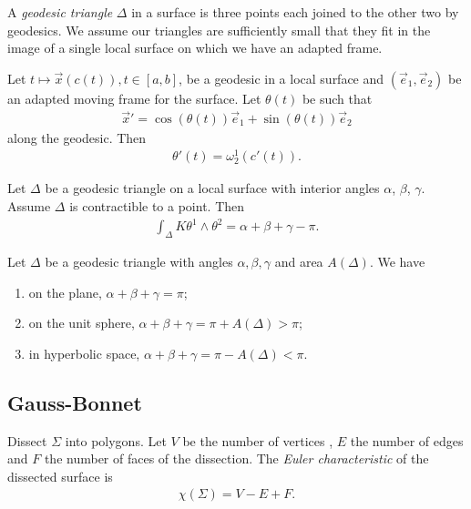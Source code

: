 \documentclass{article}
\begin{document}
\begin{definition}
    A \emph{geodesic triangle} $\Delta$ in a surface is three points each joined to the other 
    two by geodesics. We assume our triangles are sufficiently small that they fit in the image 
    of a single local surface on which we have an adapted frame.
\end{definition}

\begin{proposition}
    Let $t\mapsto \vec x(c(t)), t\in[a,b]$, be a geodesic in a local surface and $(\vec e_1, \vec e_2)$
    be an adapted moving frame for the surface. Let $\theta(t)$ be such that 
    \begin{align*}
        \vec x' = \cos(\theta(t)) \vec e_1 + \sin(\theta(t)) \vec e_2
    \end{align*}
    along the geodesic. Then 
    \begin{align*}
        \theta'(t) = \omega_2^1 (c'(t)).
    \end{align*}
\end{proposition}

\begin{theorem}
    Let $\Delta$ be a geodesic triangle on a local surface with interior angles $\alpha$, $\beta$,
    $\gamma$. Assume $\Delta$ is contractible to a point. Then 
    \begin{align*}
        \int_\Delta K\theta^1\wedge\theta^2 = \alpha + \beta + \gamma - \pi.
    \end{align*}
\end{theorem}

\begin{corollary}
    Let $\Delta$ be a geodesic triangle with angles $\alpha,\beta,\gamma$ and area $A(\Delta)$.
    We have 
    \begin{enumerate}
        \item on the plane, $\alpha+\beta+\gamma = \pi$;
        \item on the unit sphere, $\alpha + \beta + \gamma = \pi + A(\Delta) > \pi$;
        \item in hyperbolic space, $\alpha + \beta + \gamma = \pi - A(\Delta) < \pi$.
    \end{enumerate}
\end{corollary}

\subsection{Gauss-Bonnet}

\begin{definition}
    Dissect $\Sigma$ into polygons. Let $V$ be the number of vertices , $E$ the number of edges
    and $F$ the number of faces of the dissection. The \emph{Euler characteristic} of the 
    dissected surface is 
    \begin{align*}
        \chi(\Sigma) = V - E + F.
    \end{align*}
\end{definition}
\end{document}
